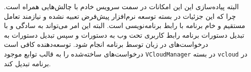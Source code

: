 البته پیاده‌سازی این این امکانات در سمت سرویس خادم با چالش‌هایی همراه است. چرا که این جزئیات در بسته توسعه نرم‌افزار پیش‌فرض تعبیه نشده و نیازمند تعامل مستقیم و خام برنامه با رابط برنامه‌نویسی  است. البته این امر می‌تواند به سادگی و با تبدیل دستورات برنامه رابط کاربری تحت وب به دستورات  و سپس تبدیل دستورات  به درخواست‌های  در زبان  توسط برنامه  انجام شود. توسعه‌دهنده کافی است درخواست‌های ساخته‌شده را به قالب توابع موجود \texttt{VCloudManager} در بسته \texttt{vcloud} در برنامه تبدیل کند.